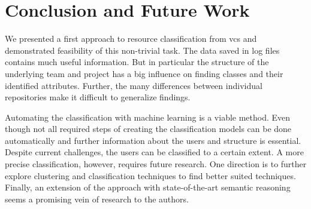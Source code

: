 


\section{Conclusion and Future Work}\label{sec:conclusion}
We presented a first approach to resource classification from \gls*{vcs} and demonstrated feasibility of this non-trivial task. The data saved in log files contains much useful information. But in particular the structure of the underlying team and project has a big influence on finding classes and their identified attributes. Further, the many differences between individual repositories make it difficult to generalize findings.

Automating the classification with machine learning is a viable method. Even though not all required steps of creating the classification models can be done automatically and further information about the users and structure is essential. Despite current challenges, the users can be classified to a certain extent. A more precise classification, however, requires future research. One direction is to further explore clustering and classification techniques to find better suited techniques. Finally, an extension of the approach with state-of-the-art semantic reasoning seems a promising vein of research to the authors.